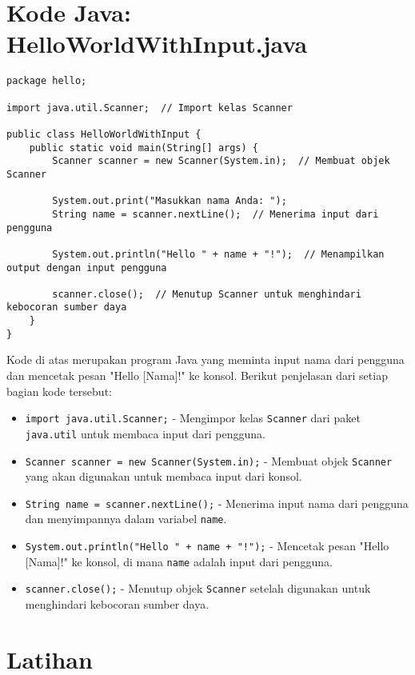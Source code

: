 \section{Kode Java: HelloWorldWithInput.java}

\begin{lstlisting}[style=JavaStyle, caption={Kode Java: HelloWorldWithInput.java}]
package hello;

import java.util.Scanner;  // Import kelas Scanner

public class HelloWorldWithInput {
	public static void main(String[] args) {
		Scanner scanner = new Scanner(System.in);  // Membuat objek Scanner
		
		System.out.print("Masukkan nama Anda: ");
		String name = scanner.nextLine();  // Menerima input dari pengguna
		
		System.out.println("Hello " + name + "!");  // Menampilkan output dengan input pengguna
		
		scanner.close();  // Menutup Scanner untuk menghindari kebocoran sumber daya
	}
}
\end{lstlisting}

Kode di atas merupakan program Java yang meminta input nama dari pengguna dan mencetak pesan "Hello [Nama]!" ke konsol. Berikut penjelasan dari setiap bagian kode tersebut:

\begin{itemize}
\item \texttt{import java.util.Scanner;} - Mengimpor kelas \texttt{Scanner} dari paket \texttt{java.util} untuk membaca input dari pengguna.
\item \texttt{Scanner scanner = new Scanner(System.in);} - Membuat objek \texttt{Scanner} yang akan digunakan untuk membaca input dari konsol.
\item \texttt{String name = scanner.nextLine();} - Menerima input nama dari pengguna dan menyimpannya dalam variabel \texttt{name}.
\item \texttt{System.out.println("Hello " + name + "!");} - Mencetak pesan "Hello [Nama]!" ke konsol, di mana \texttt{name} adalah input dari pengguna.
\item \texttt{scanner.close();} - Menutup objek \texttt{Scanner} setelah digunakan untuk menghindari kebocoran sumber daya.
\end{itemize}

\section{Latihan}

